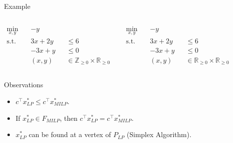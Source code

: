 \begin{frame}{Example}
\begin{columns}
	\begin{tcolorbox}[colback=white]
    \begin{align*}
    	\min_{x,y}\quad & -y \\
    	\text{s.t.}\quad & 3x + 2y &&\leq 6 \\
    	& -3x + y &&\leq 0 \\
    	& (x, y) &&\in \mathbb{Z}_{\geq 0} \times \mathbb{R}_{\geq 0}
    \end{align*}
	\end{tcolorbox}

	\begin{tcolorbox}[colback=white]
    \begin{align*}
    	\min_{x,y}\quad & -y \\
    	\text{s.t.}\quad & 3x + 2y &&\leq 6 \\
    	& -3x + y &&\leq 0 \\
    	& (x, y) &&\in \mathbb{R}_{\geq 0} \times \mathbb{R}_{\geq 0}
    \end{align*}
	\end{tcolorbox}
    
    \end{columns}
\end{frame}

\begin{frame}{Observations}
\begin{itemize}[<+->]
\item $c^\top x_{LP}^* \leq c^\top x_{MILP}^*$.

\item If $x_{LP}^* \in F_{MILP}$, then $c^\top x_{LP}^* = c^\top x_{MILP}^*$.

\item $x_{LP}^*$ can be found at a vertex of $P_{LP}$ (Simplex Algorithm).
\end{itemize}
\end{frame}